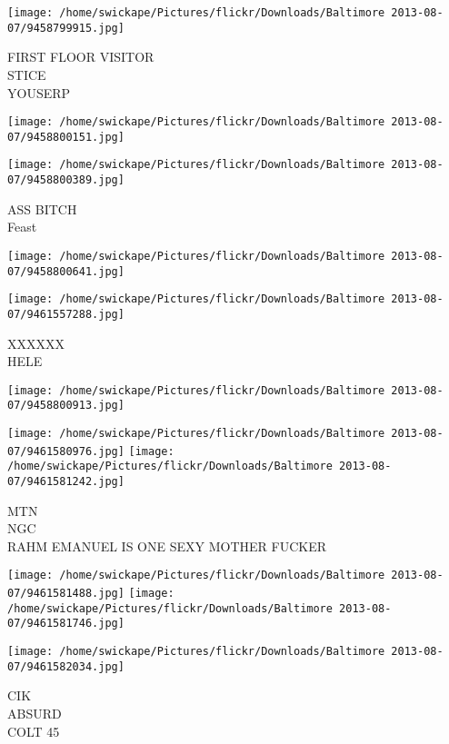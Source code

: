 \documentclass[10pt,letterpaper]{article}
\begin{document}
\vspace{0.25in}
\texttt{[image: /home/swickape/Pictures/flickr/Downloads/Baltimore 2013-08-07/9458799915.jpg]}

FIRST FLOOR VISITOR\\
STICE\\
YOUSERP
\pagebreak

\texttt{[image: /home/swickape/Pictures/flickr/Downloads/Baltimore 2013-08-07/9458800151.jpg]}

\vspace{0.25in}
\texttt{[image: /home/swickape/Pictures/flickr/Downloads/Baltimore 2013-08-07/9458800389.jpg]}

ASS BITCH\\
Feast
\pagebreak

\texttt{[image: /home/swickape/Pictures/flickr/Downloads/Baltimore 2013-08-07/9458800641.jpg]}

\vspace{0.25in}
\texttt{[image: /home/swickape/Pictures/flickr/Downloads/Baltimore 2013-08-07/9461557288.jpg]}

XXXXXX\\
HELE
\pagebreak

\texttt{[image: /home/swickape/Pictures/flickr/Downloads/Baltimore 2013-08-07/9458800913.jpg]}

\vspace{0.25in}
\texttt{[image: /home/swickape/Pictures/flickr/Downloads/Baltimore 2013-08-07/9461580976.jpg]}
\texttt{[image: /home/swickape/Pictures/flickr/Downloads/Baltimore 2013-08-07/9461581242.jpg]}

MTN\\
NGC\\
RAHM EMANUEL IS ONE SEXY MOTHER FUCKER
\pagebreak

\texttt{[image: /home/swickape/Pictures/flickr/Downloads/Baltimore 2013-08-07/9461581488.jpg]}
\texttt{[image: /home/swickape/Pictures/flickr/Downloads/Baltimore 2013-08-07/9461581746.jpg]}

\vspace{0.25in}
\texttt{[image: /home/swickape/Pictures/flickr/Downloads/Baltimore 2013-08-07/9461582034.jpg]}

CIK\\
ABSURD\\
COLT 45
\pagebreak
\end{document}
